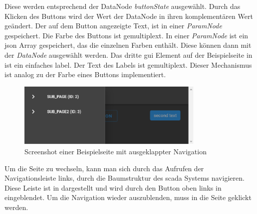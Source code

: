 Diese werden entsprechend der DataNode \emph{buttonState} ausgewählt. 
Durch das Klicken des Buttons wird der Wert der DataNode in ihren komplementären Wert geändert.
Der auf dem Button angezeigte Text, ist in einer \emph{ParamNode} gespeichert. Die Farbe des Buttons ist gemultiplext.
In einer \emph{ParamNode} ist ein \ac{json} Array gespeichert, das die einzelnen Farben enthält.
Diese können dann mit der  \emph{DataNode} ausgewählt werden. 
Das dritte \ac{gui} Element auf der Beispielseite in  ist ein einfaches label.
Der Text des Labels ist gemultiplext. Dieser Mechanismus ist analog zu der Farbe eines Buttons implementiert. 

\begin{figure}[ht]
  \centering
  \includegraphics[width=0.8\textwidth]{content/hauptteil/umsetzungPoC/frontend/res/nav.pdf}
  \caption{Screenshot einer Beispielseite mit ausgeklappter Navigation}
  \label{fig:frontend:poc:page:nav}
\end{figure}
Um die Seite zu wechseln, kann man sich durch das Aufrufen der Navigationsleiste links, durch die Baumstruktur des \ac{scada} Systems navigieren.
Diese Leiste ist in  dargestellt und wird durch den Button oben links in  eingeblendet.
Um die Navigation wieder auszublenden, muss in die Seite geklickt werden.